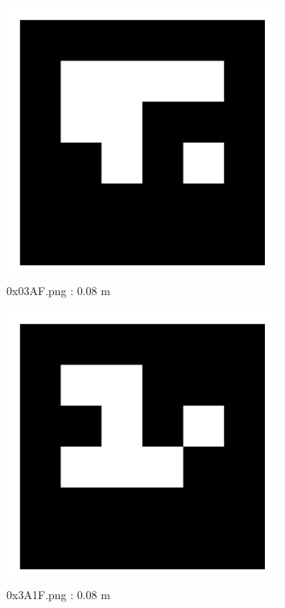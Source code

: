 \documentclass[11pt,a4,BCOR=0cm]{scrartcl}
\begin{document}
\begin{figure}
  \centering
    \includegraphics[width=8.955cm]{0x03AF.pdf}
    \caption{0x03AF.png : 0.08 m}
    \label{fig:0x03AF.pdf}
  
\end{figure} 

\begin{figure}
  \centering
    \includegraphics[width=8.955cm]{0x3A1F.pdf}
    \caption{0x3A1F.png : 0.08 m}
    \label{fig:0x3A1F.pdf}
  
\end{figure} 

\clearpage
\end{document}
